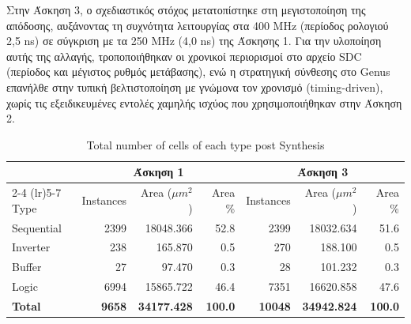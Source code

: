 Στην Άσκηση 3, ο σχεδιαστικός στόχος μετατοπίστηκε στη μεγιστοποίηση της απόδοσης, αυξάνοντας τη συχνότητα λειτουργίας στα 400 MHz (περίοδος ρολογιού 2,5 ns) σε σύγκριση με τα 250 MHz (4,0 ns) της Άσκησης 1. Για την υλοποίηση αυτής της αλλαγής, τροποποιήθηκαν οι χρονικοί περιορισμοί στο αρχείο SDC (περίοδος και μέγιστος ρυθμός μετάβασης), ενώ η στρατηγική σύνθεσης στο Genus επανήλθε στην τυπική βελτιστοποίηση με γνώμονα τον χρονισμό (timing-driven), χωρίς τις εξειδικευμένες εντολές χαμηλής ισχύος που χρησιμοποιήθηκαν στην Άσκηση 2.

\begin{table}[H]
    \centering
    \caption{Total number of cells of each type post Synthesis}
    \begin{tabular}{lrrrrrr}
        \toprule
         & \multicolumn{3}{c}{\textbf{Άσκηση 1}} & \multicolumn{3}{c}{\textbf{Άσκηση 3}} \\
        \cmidrule(lr){2-4} \cmidrule(lr){5-7}
        Type & Instances & Area ($\mu m^2$) & Area \% & Instances & Area ($\mu m^2$) & Area \% \\
        \midrule
        Sequential & 2399 & 18048.366 & 52.8 & 2399 & 18032.634 & 51.6 \\
        Inverter & 238 & 165.870 & 0.5 & 270 & 188.100 & 0.5 \\
        Buffer & 27 & 97.470 & 0.3 & 28 & 101.232 & 0.3 \\
        Logic & 6994 & 15865.722 & 46.4 & 7351 & 16620.858 & 47.6 \\
        \midrule
        \textbf{Total} & \textbf{9658} & \textbf{34177.428} & \textbf{100.0} & \textbf{10048} & \textbf{34942.824} & \textbf{100.0} \\
        \bottomrule
    \end{tabular}
\end{table}

\begin{table}[H]
    \centering
    \caption{Power consumption per category post Synthesis}
\end{table}

